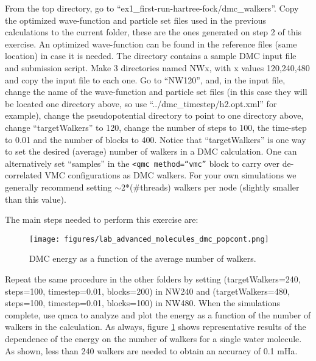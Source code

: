 From the top directory, go to ``ex1\_first-run-hartree-fock/dmc\_walkers''. Copy the
optimized wave-function and particle set files used in the previous calculations to the current
folder, these are the ones generated on step 2 of this exercise. An optimized wave-function can be found in the reference files (same location) in case it is needed. The directory
contains a sample DMC input file and submission script. Make 3 directories named NWx,
with x values 120,240,480 and copy the input file to each one. Go
to ``NW120'', and, in the input file, change the name of the wave-function and particle set
files (in this case they will be located one directory above, so use ``../dmc\_timestep/h2.opt.xml'' for
example), change the pseudopotential directory to point to one directory above, change ``targetWalkers'' to 120, change the number of steps to 100, the time-step
to 0.01 and the number of blocks to 400. Notice that ``targetWalkers'' is one way to set the desired (average) number of walkers in a DMC calculation. One can alternatively set ``samples'' in the \texttt{<qmc method=``vmc''} block to carry over de-correlated VMC configurations as DMC walkers. For your own simulations we generally recommend setting $\sim$2*(\#threads)
walkers per node (slightly smaller than this value).

The main steps needed to perform this exercise are:

\begin{figure}
\begin{center}
\texttt{[image: figures/lab\_advanced\_molecules\_dmc\_popcont.png]}
\end{center}
\caption{DMC energy as a function of the average number of walkers.
\label{fig:lam_dmc_popcont}
}
\end{figure}

Repeat the same procedure in the other folders by setting (targetWalkers=240,
steps=100, timestep=0.01, blocks=200) in NW240 and (targetWalkers=480, 
steps=100, timestep=0.01, blocks=100) in NW480. When
the simulations complete, use qmca to analyze and plot the energy as a function of the
number of walkers in the calculation. As always, figure \ref{fig:lam_dmc_popcont} 
shows representative results of the
dependence of the energy on the number of walkers for a single water molecule. As shown,
less than 240 walkers are needed to obtain an accuracy of 0.1 mHa.


